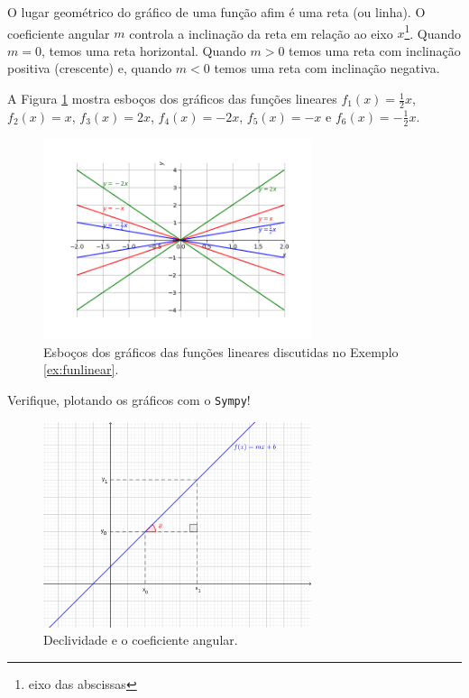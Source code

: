 O lugar geométrico do gráfico de uma função afim é uma reta (ou linha). O coeficiente angular $m$ controla a inclinação da reta em relação ao eixo $x$\footnote{eixo das abscissas}. Quando $m=0$, temos uma reta horizontal. Quando $m>0$ temos uma reta com inclinação positiva (crescente) e, quando $m<0$ temos uma reta com inclinação negativa.

\begin{ex}\label{ex:funlinear}
  A Figura \ref{fig:ex_funlinear} mostra esboços dos gráficos das funções lineares $f_1(x)=\frac{1}{2}x$, $f_2(x) = x$, $f_3(x) = 2x$, $f_4(x)=-2x$, $f_5(x)=-x$ e $f_6(x)=-\frac{1}{2}x$.
  
  \begin{figure}[H]
    \centering
    \includegraphics[width=0.7\textwidth]{./cap_funcao/dados/fig_ex_funlinear/fig_ex_funlinear}
    \caption{Esboços dos gráficos das funções lineares discutidas no Exemplo \ref{ex:funlinear}.}
    \label{fig:ex_funlinear}
  \end{figure}

  \ifispython
  Verifique, plotando os gráficos com o \verb+Sympy+!
\end{ex}

\begin{figure}[H]
  \centering
  \includegraphics[width=0.7\textwidth]{./cap_funcao/dados/fig_declividade/fig_declividade}
  \caption{Declividade e o coeficiente angular.}
  \label{fig:declividade}
\end{figure}

